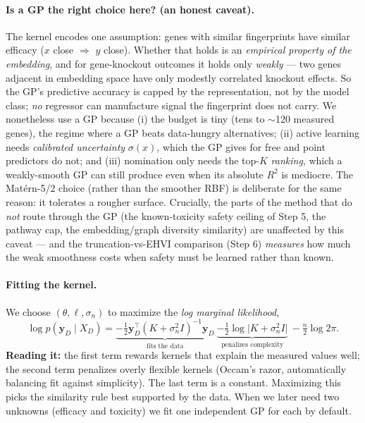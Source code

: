 \documentclass[11pt]{article}
\begin{document}
\paragraph{Is a GP the right choice here? (an honest caveat).} The kernel encodes one
assumption: genes with similar fingerprints have similar efficacy ($x$ close $\Rightarrow$
$y$ close). Whether that holds is an \emph{empirical property of the embedding}, and for
gene-knockout outcomes it holds only \emph{weakly} --- two genes adjacent in embedding space
have only modestly correlated knockout effects. So the GP's predictive accuracy is capped
by the representation, not by the model class; \emph{no} regressor can manufacture signal the
fingerprint does not carry. We nonetheless use a GP because (i) the budget is tiny (tens to
$\sim$120 measured genes), the regime where a GP beats data-hungry alternatives; (ii) active
learning needs \emph{calibrated uncertainty} $\sigma(x)$, which the GP gives for free and
point predictors do not; and (iii) nomination only needs the top-$K$ \emph{ranking}, which a
weakly-smooth GP can still produce even when its absolute $R^2$ is mediocre. The Mat\'ern-5/2
choice (rather than the smoother RBF) is deliberate for the same reason: it tolerates a
rougher surface. Crucially, the parts of the method that do \emph{not} route through the GP
(the known-toxicity safety ceiling of Step 5, the pathway cap, the embedding/graph diversity
similarity) are unaffected by this caveat --- and the truncation-vs-EHVI comparison (Step 6)
\emph{measures} how much the weak smoothness costs when safety must be learned rather than
known.

\paragraph{Fitting the kernel.} We choose $(\theta,\ell,\sigma_n)$ to maximize the
\emph{log marginal likelihood},
\begin{equation}
\log p(\mathbf{y}_D\mid X_D)= \underbrace{-\tfrac12 \mathbf{y}_D^\top(K+\sigma_n^2 I)^{-1}\mathbf{y}_D}_{\text{fits the data}}
\ \underbrace{-\tfrac12\log\lvert K+\sigma_n^2 I\rvert}_{\text{penalizes complexity}}\ -\tfrac{n}{2}\log 2\pi .
\end{equation}
\textbf{Reading it:} the first term rewards kernels that explain the measured values well;
the second term penalizes overly flexible kernels (Occam's razor, automatically balancing
fit against simplicity). The last term is a constant. Maximizing this picks the
similarity rule best supported by the data. When we later need two unknowns (efficacy and
toxicity) we fit one independent GP for each by default.
\end{document}
